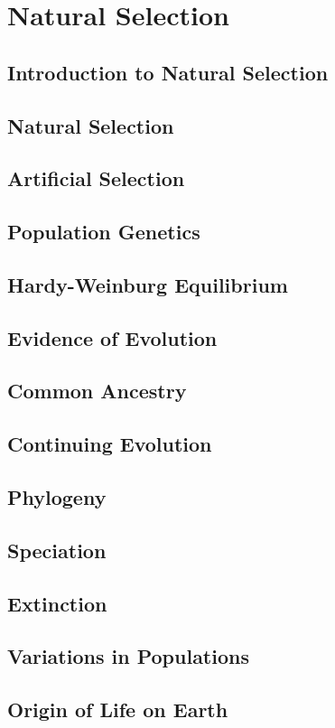 \documentclass[../bio.tex]{subfiles}
\begin{document}
\chapter{Natural Selection}
\section{Introduction to Natural Selection}
\section{Natural Selection}
\section{Artificial Selection}
\section{Population Genetics}
\section{Hardy-Weinburg Equilibrium}
\section{Evidence of Evolution}
\section{Common Ancestry}
\section{Continuing Evolution}
\section{Phylogeny}
\section{Speciation}
\section{Extinction}
\section{Variations in Populations}
\section{Origin of Life on Earth}
\end{document}
